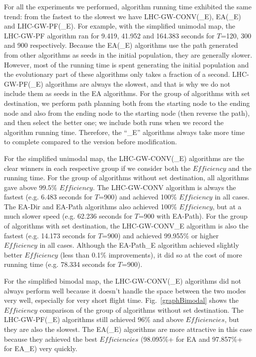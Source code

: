 For all the experiments we performed, algorithm running time exhibited the same trend: from the fastest to the slowest we have LHC-GW-CONV(\_E), EA(\_E) and LHC-GW-PF(\_E). For example, with the simplified unimodal map, the LHC-GW-PF algorithm ran for 9.419, 41.952 and 164.383 seconds for $T$=120, 300 and 900 respectively. Because the EA(\_E) algorithms use the path generated from other algorithms as seeds in the initial population, they are generally slower. However, most of the running time is spent generating the initial population and the evolutionary part of these algorithms only takes a fraction of a second. LHC-GW-PF(\_E) algorithms are always the slowest, and that is why we do not include them as seeds in the EA algorithms. For the group of algorithms with set destination, we perform path planning both from the starting node to the ending node and also from the ending node to the starting node (then reverse the path), and then select the better one; we include both runs when we record the algorithm running time. Therefore, the ``\_E'' algorithms always take more time to complete compared to the version before modification.

For the simplified unimodal map, the LHC-GW-CONV(\_E) algorithms are the clear winners in each respective group if we consider both the $\mathit{Efficiency}$ and the running time. For the group of algorithms without set destination, all algorithms gave above $99.5\%$ $\mathit{Efficiency}$. The LHC-GW-CONV algorithm is always the fastest  (e.g. 6.483 seconds for $T$=900) and achieved 100\% $\mathit{Efficiency}$ in all cases. The EA-Dir and EA-Path algorithms also achieved 100\% $\mathit{Efficiency}$, but at a much slower speed (e.g. 62.236 seconds for $T$=900 with EA-Path). For the group of algorithms with set destination, the LHC-GW-CONV\_E algorithm is also the fastest  (e.g. 14.173 seconds for $T$=900) and achieved 99.955\% or higher $\mathit{Efficiency}$ in all cases. Although the EA-Path\_E algorithm achieved slightly better $\mathit{Efficiency}$ (less than 0.1\% improvements), it did so at the cost of more running time (e.g. 78.334 seconds for $T$=900).

For the simplified bimodal map, the LHC-GW-CONV(\_E) algorithms did not always perform well because it doesn't handle the space between the two modes very well, especially for very short flight time. Fig.~\ref{graphBimodal} shows the $\mathit{Efficiency}$ comparison of the group of algorithms without set destination. The LHC-GW-PF(\_E) algorithms still achieved 96\% and above $\mathit{Efficiencies}$, but they are also the slowest. The EA(\_E) algorithms are more attractive in this case because they achieved the best $\mathit{Efficiencies}$ (98.095\%+ for EA and 97.857\%+ for EA\_E) very quickly.

